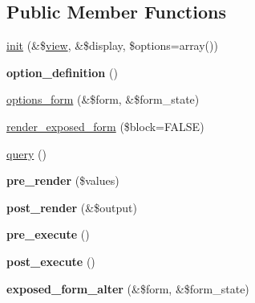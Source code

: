 \subsection*{Public Member Functions}
\begin{DoxyCompactItemize}
\item 
\hyperlink{classviews__plugin__exposed__form_a904dfe8240f8b8c26fe70422ccc7d2b4}{init} (\&\$\hyperlink{classview}{view}, \&\$display, \$options=array())
\item 
\hypertarget{classviews__plugin__exposed__form_a2561f60057c127639e7ba9ed261b6c88}{
{\bfseries option\_\-definition} ()}
\label{classviews__plugin__exposed__form_a2561f60057c127639e7ba9ed261b6c88}

\item 
\hyperlink{classviews__plugin__exposed__form_a546ecbe4ca1989a9e60a6228d0b8fb15}{options\_\-form} (\&\$form, \&\$form\_\-state)
\item 
\hyperlink{classviews__plugin__exposed__form_a6eec58838976404573957671fd73a63b}{render\_\-exposed\_\-form} (\$block=FALSE)
\item 
\hyperlink{classviews__plugin__exposed__form_a6e0fedda54c9532c3827b0b97807ac7e}{query} ()
\item 
\hypertarget{classviews__plugin__exposed__form_a6db244bed05c59ed86c1741339e3b6f3}{
{\bfseries pre\_\-render} (\$values)}
\label{classviews__plugin__exposed__form_a6db244bed05c59ed86c1741339e3b6f3}

\item 
\hypertarget{classviews__plugin__exposed__form_acbb12e04b4639be02276745e4b29ef68}{
{\bfseries post\_\-render} (\&\$output)}
\label{classviews__plugin__exposed__form_acbb12e04b4639be02276745e4b29ef68}

\item 
\hypertarget{classviews__plugin__exposed__form_a57c2c4d8d5e9e206c4cc28e1ba37d80a}{
{\bfseries pre\_\-execute} ()}
\label{classviews__plugin__exposed__form_a57c2c4d8d5e9e206c4cc28e1ba37d80a}

\item 
\hypertarget{classviews__plugin__exposed__form_ad863180e2a1ed2d83954012b133ba3d0}{
{\bfseries post\_\-execute} ()}
\label{classviews__plugin__exposed__form_ad863180e2a1ed2d83954012b133ba3d0}

\item 
\hypertarget{classviews__plugin__exposed__form_aeab5962f3881d5ddcfc4971b80a8f59c}{
{\bfseries exposed\_\-form\_\-alter} (\&\$form, \&\$form\_\-state)}
\label{classviews__plugin__exposed__form_aeab5962f3881d5ddcfc4971b80a8f59c}


\end{DoxyCompactItemize}
